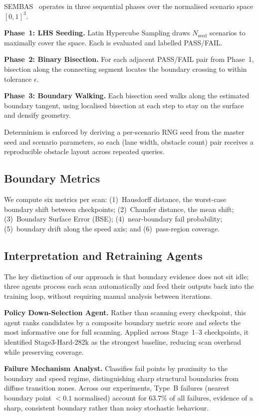 \documentclass[conference]{IEEEtran}
\begin{document}
SEMBAS~\cite{b1} operates in three sequential phases over the normalised
scenario space $[0,1]^3$.

\textbf{Phase~1: LHS Seeding.} Latin Hypercube Sampling draws $N_{\text{seed}}$
scenarios to maximally cover the space. Each is evaluated and labelled
PASS/FAIL.

\textbf{Phase~2: Binary Bisection.} For each adjacent PASS/FAIL pair from
Phase~1, bisection along the connecting segment locates the boundary crossing
to within tolerance $\epsilon$.

\textbf{Phase~3: Boundary Walking.} Each bisection seed walks along the
estimated boundary tangent, using localised bisection at each step to stay
on the surface and densify geometry.

Determinism is enforced by deriving a per-scenario RNG seed from the master
seed and scenario parameters, so each (lane width, obstacle count) pair
receives a reproducible obstacle layout across repeated queries.

\subsection{Boundary Metrics}

We compute six metrics per scan: (1)~Hausdorff distance, the worst-case
boundary shift between checkpoints; (2)~Chamfer distance, the mean shift;
(3)~Boundary Surface Error (BSE); (4)~near-boundary fail probability;
(5)~boundary drift along the speed axis; and (6)~pass-region coverage.

\subsection{Interpretation and Retraining Agents}

The key distinction of our approach is that boundary evidence does not sit
idle; three agents process each scan automatically and feed their outputs
back into the training loop, without requiring manual analysis between
iterations.

\textbf{Policy Down-Selection Agent.} Rather than scanning every checkpoint,
this agent ranks candidates by a composite boundary metric score and selects
the most informative one for full scanning. Applied across Stage~1--3
checkpoints, it identified Stage3-Hard-282k as the strongest baseline,
reducing scan overhead while preserving coverage.

\textbf{Failure Mechanism Analyst.} Classifies fail points by proximity to
the boundary and speed regime, distinguishing sharp structural boundaries from
diffuse transition zones. Across our experiments, Type~B failures (nearest
boundary point ${<}0.1$ normalised) account for 63.7\% of all failures,
evidence of a sharp, consistent boundary rather than noisy stochastic
behaviour.
\end{document}
